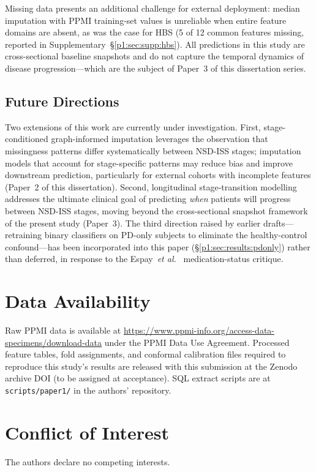 Missing data presents an additional challenge for external deployment: median imputation with PPMI training-set values is unreliable when entire feature domains are absent, as was the case for HBS (5 of 12 common features missing, reported in Supplementary~\S\ref{p1:sec:supp:hbs}). All predictions in this study are cross-sectional baseline snapshots and do not capture the temporal dynamics of disease progression---which are the subject of Paper~3 of this dissertation series.

\subsection{Future Directions}
Two extensions of this work are currently under investigation. First, stage-conditioned graph-informed imputation leverages the observation that missingness patterns differ systematically between NSD-ISS stages; imputation models that account for stage-specific patterns may reduce bias and improve downstream prediction, particularly for external cohorts with incomplete features (Paper~2 of this dissertation). Second, longitudinal stage-transition modelling addresses the ultimate clinical goal of predicting \emph{when} patients will progress between NSD-ISS stages, moving beyond the cross-sectional snapshot framework of the present study (Paper~3). The third direction raised by earlier drafts---retraining binary classifiers on PD-only subjects to eliminate the healthy-control confound---has been incorporated into this paper (\S\ref{p1:sec:results:pdonly}) rather than deferred, in response to the Espay~\textit{et al.}~\cite{espay2025med} medication-status critique.

\section*{Data Availability}
\label{p1:sec:data-availability}
Raw PPMI data is available at \url{https://www.ppmi-info.org/access-data-specimens/download-data} under the PPMI Data Use Agreement. Processed feature tables, fold assignments, and conformal calibration files required to reproduce this study's results are released with this submission at the Zenodo archive DOI (to be assigned at acceptance). SQL extract scripts are at \texttt{scripts/paper1/} in the authors' repository.

\section*{Conflict of Interest}
The authors declare no competing interests.

